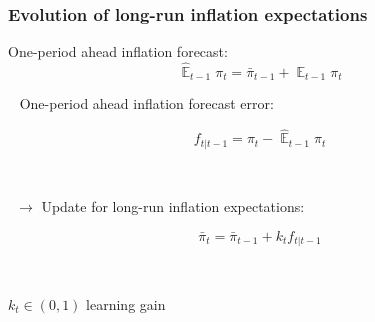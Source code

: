\documentclass[10pt]{beamer}
\DeclareMathOperator{\E}{\mathbb{E}}
\begin{document}
\begin{frame}
	\frametitle{Evolution of long-run inflation expectations}
	\label{adaptive_learning}

 One-period ahead inflation forecast:
 \begin{equation}
 \hat{\E}_{t-1}\pi_{t} = \bar{\pi}_{t-1}+\E_{t-1}\pi_t
 \end{equation}

\
\pause
One-period ahead inflation forecast error:

 \begin{equation}
f_{t|t-1}  = \pi_{t} -  \hat{\E}_{t-1}\pi_{t}
 \end{equation}

\
\pause

\
$\rightarrow$ Update for long-run inflation expectations:	

\begin{equation}
\bar{\pi}_{t}  =\bar{\pi}_{t-1} +k_t  f_{t|t-1} 
\end{equation}
 
 \
 
 $k_t \in (0,1)$ learning gain \\
\vfill 








\end{frame}
\end{document}
